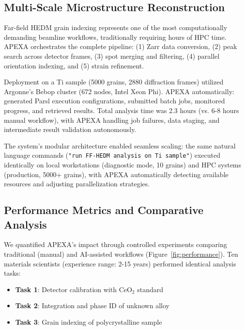 \documentclass[11pt]{article}
\begin{document}
\subsection{Multi-Scale Microstructure Reconstruction}

Far-field HEDM grain indexing represents one of the most computationally demanding beamline workflows, traditionally requiring hours of HPC time. APEXA orchestrates the complete pipeline: (1) Zarr data conversion, (2) peak search across detector frames, (3) spot merging and filtering, (4) parallel orientation indexing, and (5) strain refinement.

Deployment on a Ti sample (5000 grains, 2880 diffraction frames) utilized Argonne's Bebop cluster (672 nodes, Intel Xeon Phi). APEXA automatically: generated Parsl execution configurations, submitted batch jobs, monitored progress, and retrieved results. Total analysis time was 2.3 hours (vs. 6-8 hours manual workflow), with APEXA handling job failures, data staging, and intermediate result validation autonomously.

The system's modular architecture enabled seamless scaling: the same natural language commands (\texttt{"run FF-HEDM analysis on Ti sample"}) executed identically on local workstations (diagnostic mode, 10 grains) and HPC systems (production, 5000+ grains), with APEXA automatically detecting available resources and adjusting parallelization strategies.

\subsection{Performance Metrics and Comparative Analysis}

We quantified APEXA's impact through controlled experiments comparing traditional (manual) and AI-assisted workflows (Figure~\ref{fig:performance}). Ten materials scientists (experience range: 2-15 years) performed identical analysis tasks:

\begin{itemize}
    \item \textbf{Task 1}: Detector calibration with CeO$_2$ standard
    \item \textbf{Task 2}: Integration and phase ID of unknown alloy
    \item \textbf{Task 3}: Grain indexing of polycrystalline sample
\end{itemize}
\end{document}

